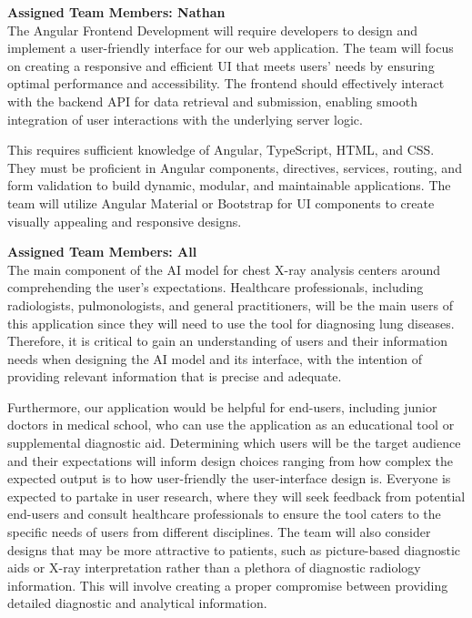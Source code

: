 \documentclass[12pt]{article}
\begin{document}
\begin{enumerate}
\textbf{Assigned Team Members: Nathan} \\
The Angular Frontend Development will require developers to design and implement a user-friendly interface for our web application. The team will focus on creating a responsive and efficient UI that meets users' needs by ensuring optimal performance and accessibility. The frontend should effectively interact with the backend API for data retrieval and submission, enabling smooth integration of user interactions with the underlying server logic.

This requires sufficient knowledge of Angular, TypeScript, HTML, and CSS. They must be proficient in Angular components, directives, services, routing, and form validation to build dynamic, modular, and maintainable applications. The team will utilize Angular Material or Bootstrap for UI components to create visually appealing and responsive designs.


\textbf{Assigned Team Members: All} \\
The main component of the AI model for chest X-ray analysis centers around comprehending the user’s expectations. Healthcare professionals, including radiologists, pulmonologists, and general practitioners, will be the main users of this application since they will need to use the tool for diagnosing lung diseases. Therefore, it is critical to gain an understanding of users and their information needs when designing the AI model and its interface, with the intention of providing relevant information that is precise and adequate.

Furthermore, our application would be helpful for end-users, including junior doctors in medical school, who can use the application as an educational tool or supplemental diagnostic aid. Determining which users will be the target audience and their expectations will inform design choices ranging from how complex the expected output is to how user-friendly the user-interface design is. Everyone is expected to partake in user research, where they will seek feedback from potential end-users and consult healthcare professionals to ensure the tool caters to the specific needs of users from different disciplines. The team will also consider designs that may be more attractive to patients, such as picture-based diagnostic aids or X-ray interpretation rather than a plethora of diagnostic radiology information. This will involve creating a proper compromise between providing detailed diagnostic and analytical information.

  
\end{enumerate}
\end{document}
